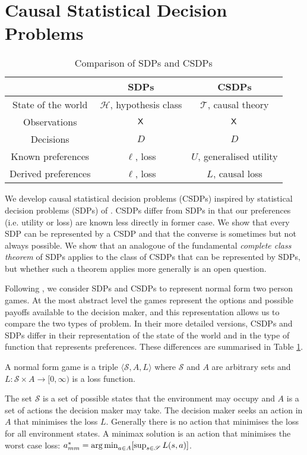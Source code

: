 
\section{Causal Statistical Decision Problems}
\vspace{-3mm}
\begin{table}[ht]
    \centering
\begin{tabular}{ |c|c|c| } 
 \hline
  & SDPs & CSDPs \\ 
 \hline
 State of the world & $\mathscr{H}$, hypothesis class & $\mathscr{T}$, causal theory \\ 
 Observations & $\mathsf{X}$ & $\mathsf{X}$ \\ 
 Decisions & $D$ & $D$ \\
 Known preferences & $\ell$, loss & $U$, generalised utility \\
 Derived preferences & $\ell$, loss & $L$, causal loss\\
 \hline
\end{tabular}
    \caption{Comparison of SDPs and CSDPs}
    \label{tab:sdp_cdp_comparison}
\end{table}

We develop causal statistical decision problems (CSDPs) inspired by statistical decision problems (SDPs) of \citet{wald_statistical_1950}. CSDPs differ from SDPs in that our preferences (i.e. utility or loss) are known less directly in former case. We show that every SDP can be represented by a CSDP and that the converse is sometimes but not always possible. We show that an analogoue of the fundamental \emph{complete class theorem} of SDPs applies to the class of CSDPs that can be represented by SDPs, but whether such a theorem applies more generally is an open question.

Following \citep{toutenburg_ferguson_1967}, we consider SDPs and CSDPs to represent normal form two person games. At the most abstract level the games represent the options and possible payoffs available to the decision maker, and this representation allows us to compare the two types of problem. In their more detailed versions,  CSDPs and SDPs differ in their representation of the state of the world and in the type of function that represents preferences. These differences are summarised in Table \ref{tab:sdp_cdp_comparison}.

\begin{definition}
A normal form game is a triple $\langle \mathscr{S}, A, L\rangle$ where $\mathscr{S}$ and $A$ are arbitrary sets and $L:\mathscr{S}\times A\to [0,\infty)$ is a loss function.

\end{definition}
The set $\mathscr{S}$ is a set of possible states that the environment may occupy and $A$ is a set of actions the decision maker may take. The decision maker seeks an action in $A$ that minimises the loss $L$. Generally there is no action that minimises the loss for all environment states. A minimax solution is an action that minimises the worst case loss: $a^*_{mm} = \operatorname*{arg\,min}_{a\in A} [\sup_{s\in \mathscr{S}} L(s,a)]$.


